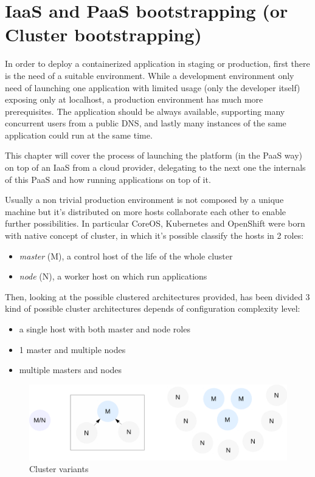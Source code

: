 \chapter{IaaS and PaaS bootstrapping (or Cluster bootstrapping)}\label{iaas-and-paas-bootstrapping}

In order to deploy a containerized application in staging or production, first there is the need of a suitable environment.  While a development environment only need of launching one application with limited usage (only the developer itself) exposing only at localhost, a production environment has much more prerequisites.  The application should be always available, supporting many concurrent users from a public DNS, and lastly many instances of the same application could run at the same time.

This chapter will cover the process of launching the platform (in the PaaS way) on top of an IaaS from a cloud provider, delegating to the next one the internals of this PaaS and how running applications on top of it.

Usually a non trivial production environment is not composed by a unique machine but it's distributed on more hosts collaborate each other to enable further possibilities.  In particular CoreOS, Kubernetes and OpenShift were born with native concept of cluster, in which it's possible classify the hosts in 2 roles:
\begin{itemize}
\item \textit{master} (M), a control host of the life of the whole cluster
\item \textit{node} (N), a worker host on which run applications
\end{itemize}

Then, looking at the possible clustered architectures provided, has been divided 3 kind of possible cluster architectures depends of configuration complexity level:
\begin{itemize}
\item a single host with both master and node roles
\item 1 master and multiple nodes
\item multiple masters and nodes
\end{itemize}

\begin{figure}[htbp]
\centering
\includegraphics{media/ch4-clusters.png}
\caption{Cluster variants}
\end{figure}

